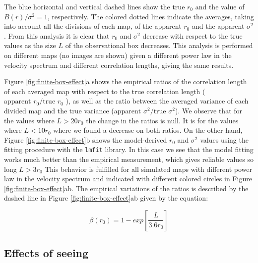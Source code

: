 \documentclass[fleqn,usenatbib, useAMS, a4paper]{mnras}
\begin{document}
The blue horizontal and vertical dashed lines show the true \(r_{0}\) and the value of \(B(r) / \sigma^2 = 1 \), respectively.
The colored dotted lines indicate the averages, taking into account all the divisions of each map, of the apparent \(r_ {0}\) and the apparent \(\sigma^2 \).
From this analysis it is clear that \(r_0\) and \(\sigma^ 2 \) decrease with respect to the true values as the size \(L\) of the observational box decreases. 
This analysis is performed on different maps (no images are shown) given a different power law in the velocity spectrum and different correlation lengths, giving the same results. 

Figure \ref{fig:finite-box-effect}a shows the empirical ratios of the correlation length of each averaged map with respect to the true correlation length (\(\text{apparent } r_ 0 /\text{true } r_0 \) ), as well as the ratio between the averaged variance of each divided map and the true variance (\(\text{apparent } \sigma^2  / \text{true } \sigma^2\)).
We observe that for the values where \(L> 20r_0 \) the change in the ratios is null.
It is for the values where \( L < 10 r_0 \) where we found a decrease on both ratios.
On the other hand, Figure \ref{fig:finite-box-effect}b shows the model-derived \(r_0\) and \(\sigma^ 2 \) values using the fitting procedure with the \texttt{lmfit} library.
In this case we see that the model fitting works much better than the empirical measurement, which gives reliable values so long \(L > 3r_0 \)
This behavior is fulfilled for all simulated maps with different power law in the velocity spectrum and  indicated with different colored circles in Figure \ref{fig:finite-box-effect}ab.
The empirical variations of the ratios is described by the  dashed line in Figure \ref{fig:finite-box-effect}ab given by the equation: 

\begin{equation}\label{eq:ajustebox}
\beta(r_0) = 1 - exp \left[ \frac{L}{3.6r_0} \right] 
\end{equation}

\subsection{Effects of seeing}
\label{sec:effects-seeing-struc}
\end{document}
